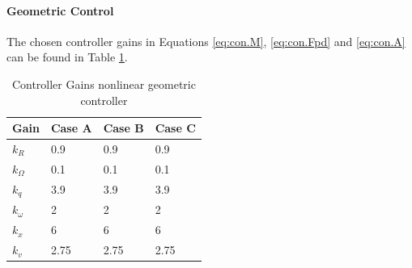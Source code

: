 
\paragraph{Geometric Control}
The chosen controller gains in Equations \ref{eq:con.M}, \ref{eq:con.Fpd} and \ref{eq:con.A} can be found in Table \ref{tab:set.gains}.
\begin{table}[h!]
	\centering
	\begin{tabular}{|l|l|l|l|}
		\hline
		\textbf{Gain}&\textbf{Case A}&\textbf{Case B}&\textbf{Case C}\\
		\hline
$	k_R	$	&	0.9	&	0.9	&	0.9	\\
$	k_\Omega	$	&	0.1	&	0.1	&	0.1	\\
$	k_q	$	&	3.9	&	3.9	&	3.9	\\
$	k_\omega	$	&	2	&	2	&	2	\\
$	k_x	$	&	6	&	6	&	6	\\
$	k_v	$	&	2.75	&	2.75	&	2.75	\\
		\hline
	\end{tabular}
	\caption{Controller Gains nonlinear geometric controller}
	\label{tab:set.gains}
\end{table}

